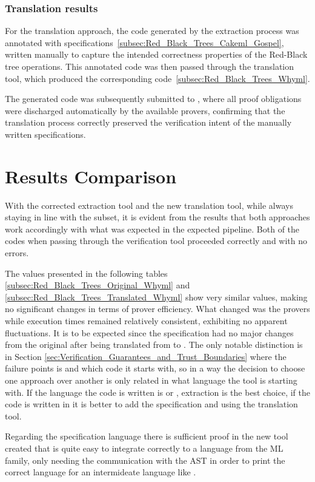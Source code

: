 \subsubsection{Translation results}

For the translation approach, the \cml code generated by the extraction process was annotated with \gospel specifications~\ref{subsec:Red_Black_Trees_Cakeml_Gospel}, 
written manually to capture the intended correctness properties of the Red-Black tree operations. This annotated \cml code was then passed through 
the translation tool, which produced the corresponding \whyml code~\ref{subsec:Red_Black_Trees_Whyml}. 

The generated \whyml code was subsequently submitted to \whythree, where all proof obligations were discharged automatically by the available provers, 
confirming that the translation process correctly preserved the verification intent of the manually written \gospel specifications.

\section{Results Comparison}

With the corrected \whythree extraction tool and the new translation tool, while always staying in line with the
\whyml subset, it is evident from the results that both approaches work accordingly with what was expected in the
expected pipeline. Both of the codes when passing through the verification tool proceeded correctly and with no errors.

The values presented in the following tables \ref{subsec:Red_Black_Trees_Original_Whyml} and \ref{subsec:Red_Black_Trees_Translated_Whyml} show 
very similar values, making no significant changes in terms of prover efficiency. What changed was the provers while execution times remained relatively 
consistent, exhibiting no apparent fluctuations. It is to be expected since the specification had no major changes from the original after being
translated from \cml to \whyml. The only notable distinction is in Section \ref{sec:Verification_Guarantees_and_Trust_Boundaries} where the 
failure points is and which code it starts with, so in a way the decision to choose one approach over another is only related in what language
the tool is starting with. If the language the code is written is \ocaml or \whyml, extraction is the best choice, if the code is written in
\cml it is better to add the \gospel specification and using the translation tool.

Regarding the \gospel specification language there is sufficient proof in the new tool created that \gospel is quite easy to integrate correctly
to a language from the ML family, only needing the communication with the \gospel AST in order to print the correct language for an 
intermideate language like \whyml.